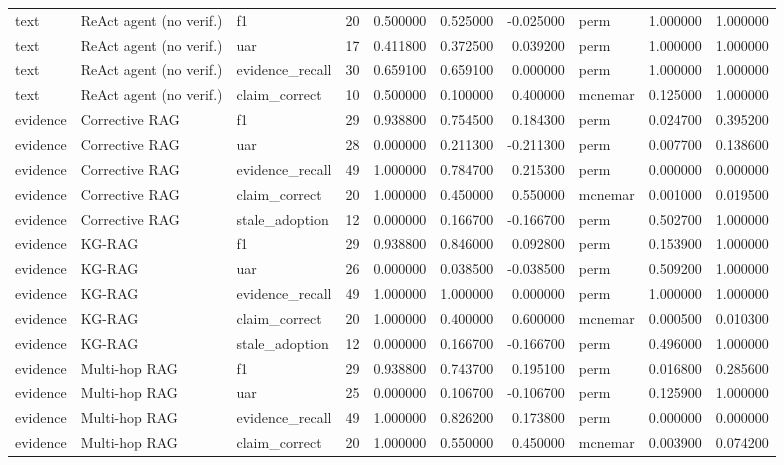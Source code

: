 \begin{table}
\begin{tabular}{lllrrrrlrr}
text & ReAct agent (no verif.) & f1 & 20 & 0.500000 & 0.525000 & -0.025000 & perm & 1.000000 & 1.000000 \\
text & ReAct agent (no verif.) & uar & 17 & 0.411800 & 0.372500 & 0.039200 & perm & 1.000000 & 1.000000 \\
text & ReAct agent (no verif.) & evidence\_recall & 30 & 0.659100 & 0.659100 & 0.000000 & perm & 1.000000 & 1.000000 \\
text & ReAct agent (no verif.) & claim\_correct & 10 & 0.500000 & 0.100000 & 0.400000 & mcnemar & 0.125000 & 1.000000 \\
evidence & Corrective RAG & f1 & 29 & 0.938800 & 0.754500 & 0.184300 & perm & 0.024700 & 0.395200 \\
evidence & Corrective RAG & uar & 28 & 0.000000 & 0.211300 & -0.211300 & perm & 0.007700 & 0.138600 \\
evidence & Corrective RAG & evidence\_recall & 49 & 1.000000 & 0.784700 & 0.215300 & perm & 0.000000 & 0.000000 \\
evidence & Corrective RAG & claim\_correct & 20 & 1.000000 & 0.450000 & 0.550000 & mcnemar & 0.001000 & 0.019500 \\
evidence & Corrective RAG & stale\_adoption & 12 & 0.000000 & 0.166700 & -0.166700 & perm & 0.502700 & 1.000000 \\
evidence & KG-RAG & f1 & 29 & 0.938800 & 0.846000 & 0.092800 & perm & 0.153900 & 1.000000 \\
evidence & KG-RAG & uar & 26 & 0.000000 & 0.038500 & -0.038500 & perm & 0.509200 & 1.000000 \\
evidence & KG-RAG & evidence\_recall & 49 & 1.000000 & 1.000000 & 0.000000 & perm & 1.000000 & 1.000000 \\
evidence & KG-RAG & claim\_correct & 20 & 1.000000 & 0.400000 & 0.600000 & mcnemar & 0.000500 & 0.010300 \\
evidence & KG-RAG & stale\_adoption & 12 & 0.000000 & 0.166700 & -0.166700 & perm & 0.496000 & 1.000000 \\
evidence & Multi-hop RAG & f1 & 29 & 0.938800 & 0.743700 & 0.195100 & perm & 0.016800 & 0.285600 \\
evidence & Multi-hop RAG & uar & 25 & 0.000000 & 0.106700 & -0.106700 & perm & 0.125900 & 1.000000 \\
evidence & Multi-hop RAG & evidence\_recall & 49 & 1.000000 & 0.826200 & 0.173800 & perm & 0.000000 & 0.000000 \\
evidence & Multi-hop RAG & claim\_correct & 20 & 1.000000 & 0.550000 & 0.450000 & mcnemar & 0.003900 & 0.074200 \\

\end{tabular}
\end{table}
